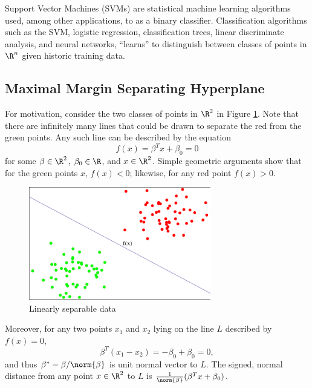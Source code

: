 \documentclass[10pt]{article}
\begin{document}


Support Vector Machines (SVMs) are statistical machine learning algorithms used, among other applications, to as a binary classifier. Classification algorithms such as the SVM, logistic regression, classification trees, linear discriminate analysis, and neural networks, ``learns'' to distinguish between classes of points in $\R^{n}$ given historic training data. 

\subsection{Maximal Margin Separating Hyperplane} %
\label{ssub:maximal_margin_separating_hyperplane}

For motivation, consider the two classes of points in $\R^{2}$ in Figure \ref{fig:sep_plot_2}. Note that there are infinitely many lines that could be drawn to separate the red from the green points. Any such line can be described by the equation
\begin{equation}
	f(x)=\beta^{T} x+\beta_{0}=0
\end{equation}
for some $\beta\in \R^{2}$, $\beta_{0}\in \R$, and $x\in \R^{2}$. Simple geometric arguments show that for the green points $x$, $f(x)<0$; likewise, for any red point $f(x)>0$. 

\begin{figure}[htb]
				\begin{center}
				\includegraphics[width=300px]{Project/sep_plot_2.pdf}
				\caption{Linearly separable data}
					\label{fig:sep_plot_2}
				\end{center}
				\end{figure}


Moreover, for any two points $x_{1}$ and $x_{2}$ lying on the line $L$ described by $f(x)=0$,
 \[
 	\beta^{T}(x_{1}-x_{2})=-\beta_{0}+\beta_{0}=0,
 \]
and thus $\beta^{*}=\beta/\norm{\beta}$ is unit normal vector to $L$. The signed, normal distance from any point $x\in \R^{2}$ to $L$ is $\frac{1}{\norm{\beta}}(\beta^{T}x+\beta_{0})$. 
\end{document}
